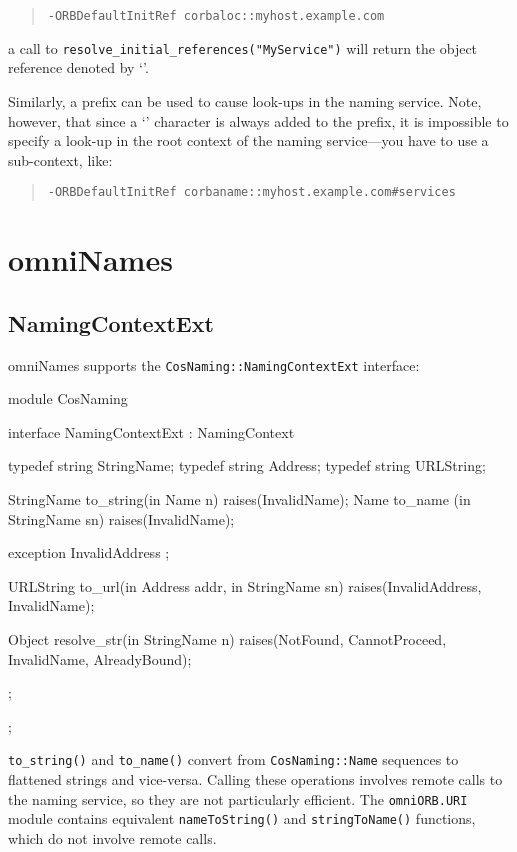 \documentclass[11pt,oneside,a4paper]{book}
\newcommand{\type}[1]{\texttt{#1}}
\newcommand{\intf}[1]{\texttt{#1}}
\newcommand{\module}[1]{\texttt{#1}}
\newcommand{\code}[1]{\texttt{#1}}
\newcommand{\op}[1]{\texttt{#1()}}
\newcommand{\cmdline}[1]{\texttt{#1}}
\begin{document}
\begin{quote}
\cmdline{-ORBDefaultInitRef corbaloc::myhost.example.com}
\end{quote}

\noindent a call to \code{resolve\_initial\_references("MyService")}
will return the object reference denoted by
`'.

Similarly, a  prefix can be used to cause
look-ups in the naming service. Note, however, that since a
`\corbauri{/}' character is always added to the prefix, it is
impossible to specify a look-up in the root context of the naming
service---you have to use a sub-context, like:

\begin{quote}
\cmdline{-ORBDefaultInitRef corbaname::myhost.example.com\#services}
\end{quote}



\section{omniNames}

\subsection{NamingContextExt}

omniNames supports the \intf{CosNaming::NamingContextExt} interface:

\begin{idllisting}
module CosNaming {
  interface NamingContextExt : NamingContext {
    typedef string StringName;
    typedef string Address;
    typedef string URLString;

    StringName  to_string(in Name n)        raises(InvalidName);
    Name        to_name  (in StringName sn) raises(InvalidName);

    exception InvalidAddress {};

    URLString   to_url(in Address addr, in StringName sn)
      raises(InvalidAddress, InvalidName);

    Object      resolve_str(in StringName n)
      raises(NotFound, CannotProceed, InvalidName, AlreadyBound);
  };
};
\end{idllisting}

\op{to\_string} and \op{to\_name} convert from \type{CosNaming::Name}
sequences to flattened strings and vice-versa.  Calling these
operations involves remote calls to the naming service, so they are
not particularly efficient. The \module{omniORB.URI} module contains
equivalent \op{nameToString} and \op{stringToName} functions, which do
not involve remote calls.
\end{document}
